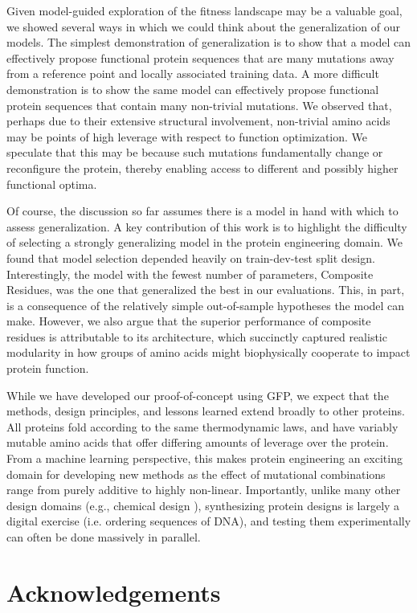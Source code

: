 Given model-guided exploration of the fitness landscape may be a valuable goal, we showed several ways in which we could think about the generalization of our models. The simplest demonstration of generalization is to show that a model can effectively propose functional protein sequences that are many mutations away from a reference point and locally associated training data.  A more difficult demonstration is to show the same model can effectively propose functional protein sequences that contain many non-trivial mutations. We observed that, perhaps due to their extensive structural involvement, non-trivial amino acids may be points of high leverage with respect to function optimization. We speculate that this may be because such mutations fundamentally change or reconfigure the protein, thereby enabling access to different and possibly higher functional optima.   

Of course, the discussion so far assumes there is a model in hand with which to assess generalization. A key contribution of this work is to highlight the difficulty of selecting a strongly generalizing model in the protein engineering domain. We found that model selection depended heavily on train-dev-test split design.  Interestingly, the model with the fewest number of parameters, Composite Residues, was the one that generalized the best in our evaluations. This, in part, is a consequence of the relatively simple out-of-sample hypotheses the model can make. However, we also argue that the superior performance of composite residues is attributable to its architecture, which succinctly captured realistic modularity in how groups of amino acids might biophysically cooperate to impact protein function.

While we have developed our proof-of-concept using GFP, we expect that the methods, design principles, and lessons learned extend broadly to other proteins. All proteins fold according to the same thermodynamic laws, and have variably mutable amino acids that offer differing amounts of leverage over the protein. From a machine learning perspective, this makes protein engineering an exciting domain for developing new methods as the effect of mutational combinations range from purely additive to highly non-linear. Importantly, unlike many other design domains (e.g., chemical design \citep{gomez2016design}), synthesizing protein designs is largely a digital exercise (i.e. ordering sequences of DNA), and testing them experimentally can often be done massively in parallel.

\section{Acknowledgements}

